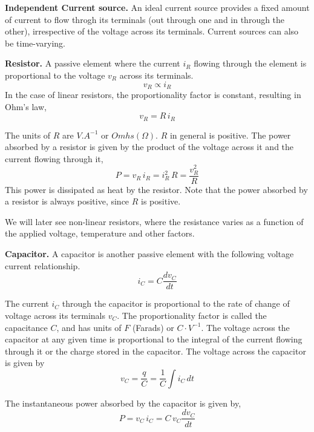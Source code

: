 \noindent \textbf{Independent Current source.} An ideal current source provides a fixed amount of current to flow throgh its terminals (out through one and in through the other), irrespective of the voltage across its terminals. Current sources can also be time-varying.

\noindent \textbf{Resistor.} A passive element where the current $i_R$ flowing through the element is proportional to the voltage $v_R$ across its terminals.
\[ v_R \propto i_R \]
In the case of linear resistors, the proportionality factor is constant, resulting in Ohm's law,
\begin{equation}
    v_R = R \, i_R
    \label{eq:02-01}
\end{equation}

The units of $R$ are $V.A^{-1}$ or $Omhs \left( \Omega \right)$. $R$ in general is positive. The power absorbed by a resistor is given by the product of the voltage across it and the current flowing through it, 
\begin{equation}
    P = v_R \, i_R = i_R^2 \, R = \frac{v_R^2}{R}
    \label{eq:02-02}
\end{equation}
This power is dissipated as heat by the resistor. Note that the power absorbed by a resistor is always positive, since $R$ is positive.

We will later see non-linear resistors, where the resistance varies as a function of the applied voltage, temperature and other factors. 

\noindent \textbf{Capacitor.} A capacitor is another passive element with the following voltage current relationship.
\begin{equation}
    i_C = C \frac{d v_C}{dt}
    \label{eq:02-03}
\end{equation}

The current $i_C$ through the capacitor is proportional to the rate of change of voltage across its terminals $v_C$. The proportionality factor is called the capacitance $C$, and has units of $F$ (Farads) or $C \cdot V^{-1}$. The voltage across the capacitor at any given time is proportional to the integral of the current flowing through it or the charge stored in the capacitor. The voltage across the capacitor is given by
\begin{equation}
    v_C = \frac{q}{C} = \frac{1}{C}\int i_C \, dt
    \label{eq:02-04}
\end{equation}

The instantaneous power absorbed by the capacitor is given by,
\begin{equation}
    P = v_C \, i_C = C \, v_C \frac{d v_C}{dt}
    \label{eq:02-05}
\end{equation}

